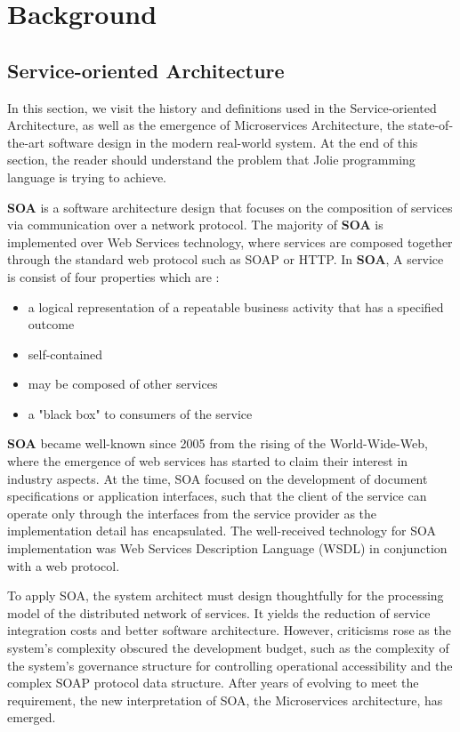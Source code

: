 \chapter{Background}

\section{Service-oriented Architecture}

In this section, we visit the history and definitions used in the Service-oriented Architecture, as well as the emergence of Microservices Architecture, the state-of-the-art software design in the modern real-world system. At the end of this section, the reader should understand the problem that Jolie programming language is trying to achieve.

\textbf{SOA} is a software architecture design that focuses on the composition of services via communication over a network protocol. The majority of \textbf{SOA} is implemented over Web Services technology, where services are composed together through the standard web protocol such as SOAP or HTTP. In \textbf{SOA}, A service is consist of four properties which are \cite{SOA_opengroup} :

\begin{itemize}
    \item a logical representation of a repeatable business activity that has a specified outcome
    \item self-contained
    \item may be composed of other services
    \item a "black box" to consumers of the service
\end{itemize}

\textbf{SOA} became well-known since 2005 from the rising of the World-Wide-Web, where the emergence of web services has started to claim their interest in industry aspects. At the time, SOA focused on the development of document specifications or application interfaces, such that the client of the service can operate only through the interfaces from the service provider as the implementation detail has encapsulated. The well-received technology for SOA implementation was Web Services Description Language (WSDL) in conjunction with a web protocol. 

To apply SOA, the system architect must design thoughtfully for the processing model of the distributed network of services. It yields the reduction of service integration costs and better software architecture. However, criticisms rose as the system's complexity obscured the development budget, such as the complexity of the system's governance structure for controlling operational accessibility and the complex SOAP protocol data structure. After years of evolving to meet the requirement,
the new interpretation of SOA, the Microservices architecture, has emerged.

